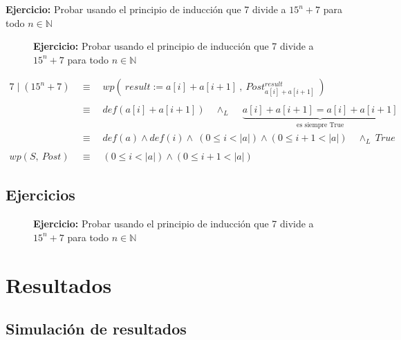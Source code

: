 \documentclass[12pt]{book}
\begin{document}
\begin{shaded}
\textbf{Ejercicio: }
Probar usando el principio de inducción que 7 divide a $ 15^{n} + 7$ para todo $n \in \mathbb N $  
\end{shaded}

\begin{figure}
\vspace{-15pt}
\begin{shaded}
\textbf{Ejercicio: } Probar usando el principio de inducción que 7 divide a $ 15^{n} + 7$ para todo $n \in \mathbb N $  
\end{shaded}
\end{figure}

\begin{equation*}
\begin{split}
7\mid (15^{n} + 7) \  &\equiv \quad wp ( \ result  := a[i] + a[i+1] \ , \ Post^{result}_{a[i] + a[i+1]} \ )  \\ \\
&\equiv  \quad  def( a[i] + a[i+1]) \quad \wedge_{L} \quad \ \underbrace{a[i] + a[i+1] = a[i] + a[i+1]}_{\text{es siempre True}}  \\
&\equiv  \quad  def( a) \wedge def(i) \wedge \ ( 0 \leq i < \vert a \vert ) \wedge (0 \leq i+1 < \vert a \vert ) \quad      \wedge_{L} \ True  \\ \\
wp(S, \ Post) \ &\equiv  \quad  ( 0 \leq i < \vert a \vert ) \wedge (0 \leq i+1 < \vert a \vert )
\end{split}
\end{equation*}




\section{Ejercicios}


\begin{figure}
\vspace{-15pt}
\begin{shaded}
\textbf{Ejercicio: } Probar usando el principio de inducción que 7 divide a $ 15^{n} + 7$ para todo $n \in \mathbb N $  
\end{shaded}
\end{figure}


\chapter{Resultados}
\section{Simulación de resultados}
\end{document}
